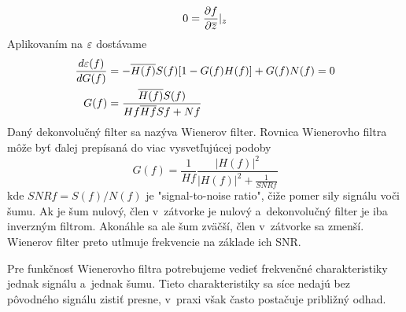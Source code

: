 \begin{equation*}
 0 = \frac{\partial f}{\partial \overline{z}}|_z
\end{equation*}
Aplikovaním na $\varepsilon$ dostávame
\begin{align*}
\frac{d \varepsilon(f)}{d G(f)} &= -\overline{H(f)} S(f)[1 - G(f) H(f)]  + G(f) N(f) =
0 \\
G(f) &= \frac{\overline{H(f)} S(f)}{H{f}\overline{H{f}} S{f} + N{f}}
\end{align*}
Daný dekonvolučný filter sa nazýva Wienerov filter.
Rovnica Wienerovho filtra môže byť ďalej prepísaná do viac vysvetľujúcej podoby
\begin{equation*}
G(f) = \frac{1}{H{f}} 
   \frac{|H(f)|^2}{|H(f)|^2 + \frac{1}{SNR{f}}}
\end{equation*}
kde $SNR{f} = S(f)/N(f)$ je "signal-to-noise ratio", čiže pomer sily
signálu voči šumu. Ak je šum
nulový, člen v~zátvorke je nulový a~dekonvolučný filter je iba
inverzným filtrom. Akonáhle sa ale šum zväčší, člen v~zátvorke sa
zmenší. Wienerov filter preto utlmuje frekvencie na základe ich SNR.

Pre funkčnosť Wienerovho filtra potrebujeme vedieť frekvenčné
charakteristiky jednak signálu a~jednak šumu. Tieto charakteristiky sa
síce nedajú bez pôvodného signálu zistiť presne, v~praxi však často
postačuje približný odhad.

\nocite{wiki:wiener}

